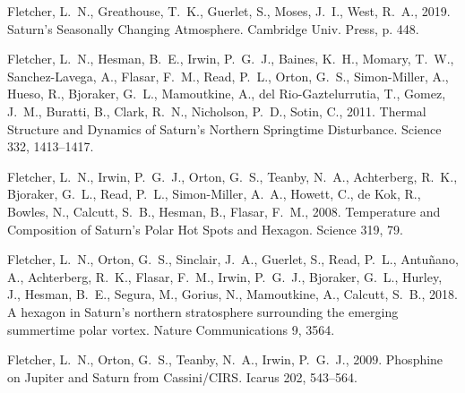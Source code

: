 \documentclass[article,11pt]{emulateapj}
\begin{document}
\begin{thebibliography}{85}
{Fletcher}, L.~N., {Greathouse}, T.~K., {Guerlet}, S., {Moses}, J.~I., {West},
  R.~A., 2019. {Saturn's Seasonally Changing Atmosphere}. {Cambridge Univ.
  Press}, p. 448.

{Fletcher}, L.~N., {Hesman}, B.~E., {Irwin}, P.~G.~J., {Baines}, K.~H.,
  {Momary}, T.~W., {Sanchez-Lavega}, A., {Flasar}, F.~M., {Read}, P.~L.,
  {Orton}, G.~S., {Simon-Miller}, A., {Hueso}, R., {Bjoraker}, G.~L.,
  {Mamoutkine}, A., {del Rio-Gaztelurrutia}, T., {Gomez}, J.~M., {Buratti}, B.,
  {Clark}, R.~N., {Nicholson}, P.~D., {Sotin}, C., 2011{}. {Thermal
  Structure and Dynamics of Saturn's Northern Springtime Disturbance}. Science
  332, 1413--1417.

{Fletcher}, L.~N., {Irwin}, P.~G.~J., {Orton}, G.~S., {Teanby}, N.~A.,
  {Achterberg}, R.~K., {Bjoraker}, G.~L., {Read}, P.~L., {Simon-Miller}, A.~A.,
  {Howett}, C., {de Kok}, R., {Bowles}, N., {Calcutt}, S.~B., {Hesman}, B.,
  {Flasar}, F.~M., 2008. {Temperature and Composition of Saturn's Polar Hot
  Spots and Hexagon}. Science 319, 79.

{Fletcher}, L.~N., {Orton}, G.~S., {Sinclair}, J.~A., {Guerlet}, S., {Read},
  P.~L., {Antu{\~n}ano}, A., {Achterberg}, R.~K., {Flasar}, F.~M., {Irwin},
  P.~G.~J., {Bjoraker}, G.~L., {Hurley}, J., {Hesman}, B.~E., {Segura}, M.,
  {Gorius}, N., {Mamoutkine}, A., {Calcutt}, S.~B., 2018. {A hexagon in
  Saturn's northern stratosphere surrounding the emerging summertime polar
  vortex}. Nature Communications 9, 3564.

{Fletcher}, L.~N., {Orton}, G.~S., {Teanby}, N.~A., {Irwin}, P.~G.~J.,
  2009{}. {Phosphine on Jupiter and Saturn from Cassini/CIRS}.
  Icarus 202, 543--564.


\end{thebibliography}
\end{document}
